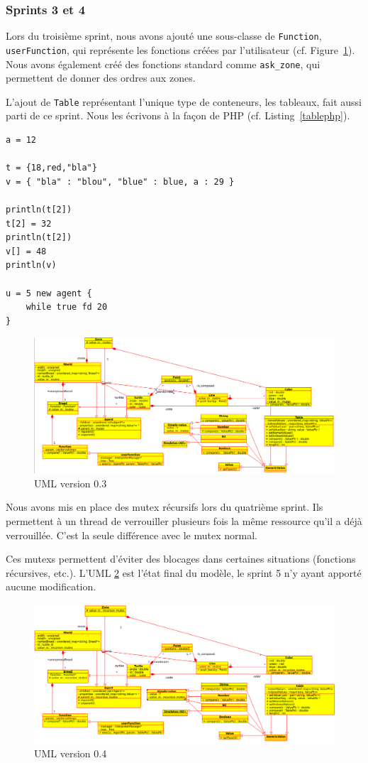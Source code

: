 \subsubsection{Sprints 3 et 4}
Lors du troisième sprint, nous avons ajouté une sous-classe de \verb|Function|, \verb|userFunction|, qui représente les fonctions créées par l'utilisateur (cf. Figure~\ref{v0.3}). Nous avons également créé des fonctions standard comme \verb|ask_zone|, qui permettent de donner des ordres aux zones.

L'ajout de \verb|Table| représentant l'unique type de conteneurs, les tableaux, fait aussi parti de ce sprint.
Nous les écrivons à la façon de PHP (cf. Listing~\ref{tablephp}).
\begin{lstlisting}[label=tablephp,caption=Syntaxe des tables en Stibbons]
a = 12

t = {18,red,"bla"}
v = { "bla" : "blou", "blue" : blue, a : 29 }

println(t[2])
t[2] = 32
println(t[2])
v[] = 48
println(v)

u = 5 new agent {
	while true fd 20
}
\end{lstlisting}

\begin{figure}[h]
\includegraphics[scale=0.4]{doc/report/uml/v03.png}
\caption{\label{v0.3} UML version 0.3}
\end{figure}

Nous avons mis en place des mutex récursifs lors du quatrième sprint. Ils permettent à un thread de verrouiller plusieurs fois la même ressource qu'il a déjà verrouillée. C'est la seule différence avec le mutex normal. 

Ces mutexs permettent d'éviter des blocages dans certaines situations (fonctions récursives, etc.).
L'UML \ref{v0.4} est l'état final du modèle, le sprint 5 n'y ayant apporté aucune modification.
\begin{figure}[h]
\includegraphics[scale=0.4]{doc/report/uml/v04.png}
\caption{\label{v0.4} UML version 0.4}
\end{figure}

